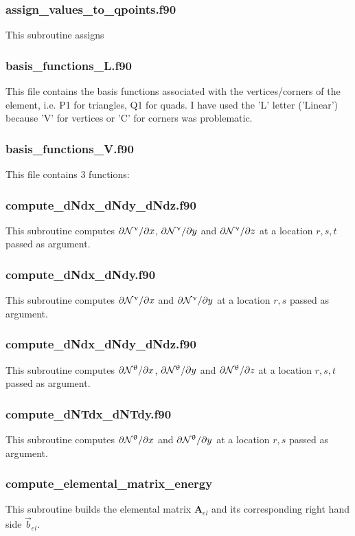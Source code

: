  \subsubsection{assign\_values\_to\_qpoints.f90}
 This subroutine assigns 
 \subsubsection{basis\_functions\_L.f90}
 This file contains the basis functions associated with the vertices/corners
 of the element, i.e. P1 for triangles, Q1 for quads. 
 I have used the 'L' letter ('Linear') because 'V' for vertices or 'C' for 
 corners was problematic.
 \subsubsection{basis\_functions\_V.f90}
 This file contains 3 functions: 
 \subsubsection{compute\_dNdx\_dNdy\_dNdz.f90}
 This subroutine computes $\partial{{\mathcal{N}}^\upnu}/\partial x$, $\partial{{\mathcal{N}}^\upnu}/\partial y$ and
 $\partial{{\mathcal{N}}^\upnu}/\partial z$ at a location $r,s,t$ passed as argument.
 \subsubsection{compute\_dNdx\_dNdy.f90}
 This subroutine computes $\partial{{\mathcal{N}}^\upnu}/\partial x$ and $\partial{{\mathcal{N}}^\upnu}/\partial y$
 at a location $r,s$ passed as argument.
 \subsubsection{compute\_dNdx\_dNdy\_dNdz.f90}
 This subroutine computes $\partial{{\mathcal{N}}^\uptheta}/\partial x$, 
 $\partial{{\mathcal{N}}^\uptheta}/\partial y$ and
 $\partial{{\mathcal{N}}^\uptheta}/\partial z$ at a location $r,s,t$ passed as argument.
 \subsubsection{compute\_dNTdx\_dNTdy.f90}
 This subroutine computes $\partial{{\mathcal{N}}^\uptheta}/\partial x$ 
 and $\partial{{\mathcal{N}}^\uptheta}/\partial y$  at a location $r,s$ passed as argument.
 \subsubsection{compute\_elemental\_matrix\_energy}
 This subroutine builds the elemental matrix ${\bm A}_{el}$ and its corresponding 
 right hand side $\vec{b}_{el}$. 
